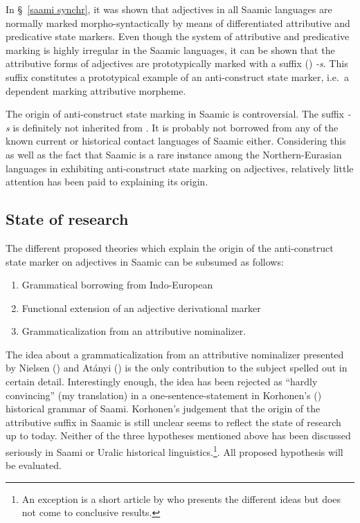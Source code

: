 {In \S~\ref{saami synchr}, it was shown that adjectives in all Saamic languages are normally marked morpho-syntactically by means of differentiated attributive and predicative state markers. Even though the system of attributive and predicative marking is highly irregular in the Saamic languages, it can be shown that the attributive forms of adjectives are prototypically marked with a suffix () \textit{-s}. This suffix constitutes a prototypical example of an anti-construct state marker, i.e.~a dependent marking attributive morpheme.

The origin of anti-construct state marking in Saamic is controversial. The suffix \textit{-s} is definitely not inherited from . It is probably not borrowed from any of the known current or historical contact languages of Saamic either. Considering this as well as the fact that Saamic is a rare instance among the Northern-Eurasian languages in exhibiting anti-construct state marking on adjectives, relatively little attention has been paid to explaining its origin.

\subsection{State of research}
The different proposed theories which explain the origin of the anti-construct state marker on adjectives in Saamic can be subsumed as follows:
\begin{enumerate}
\item Grammatical borrowing from Indo-European
\item Functional extension of an adjective derivational marker
\item Grammaticalization from an attributive nominalizer.
\end{enumerate}
The idea about a grammaticalization from an attributive nominalizer presented by Nielsen (\citeyear{nielsen1933}) and Atányi (\citeyear{atanyi1942,atanyi1943}) is the only contribution to the subject spelled out in certain detail. Interestingly enough, the idea has been rejected as “hardly convincing” (my translation) in a one-sentence-statement in Korhonen's (\citeyear{korhonen-m1981}) historical grammar of Saami. Korhonen's judgement that the origin of the attributive suffix in Saamic is still unclear \cite[246]{korhonen-m1981} seems to reflect the state of research up to today. Neither of the three hypotheses mentioned above has been discussed seriously in Saami or Uralic historical linguistics.\footnote{An exception is a short article by \cite{sarv-m2001} who presents the different ideas but does not come to conclusive results.}. All proposed hypothesis will be evaluated.

}
